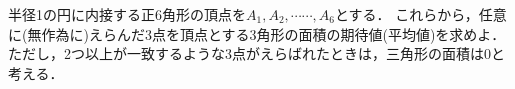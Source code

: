 \documentclass[../../main.tex]{subfiles}
\begin{document}
半径1の円に内接する正6角形の頂点を$A_1,A_2,\cdots\cdots,A_6$とする．
これらから，任意に(無作為に)えらんだ3点を頂点とする3角形の面積の期待値(平均値)を求めよ．
ただし，2つ以上が一致するような3点がえらばれたときは，三角形の面積は0と考える．
\end{document}
